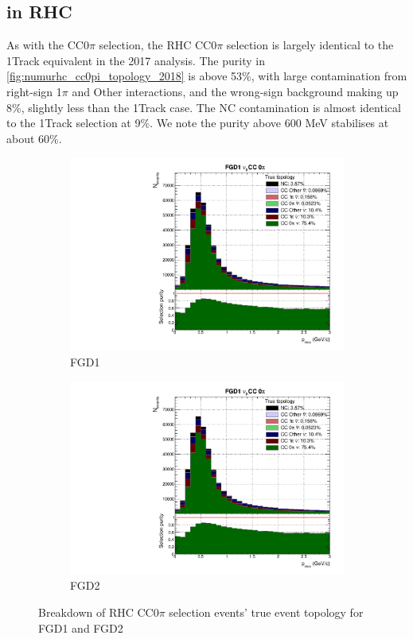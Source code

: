 \subsection{\numu in RHC}
As with the \numubar CC0$\pi$ selection, the \numu RHC CC0$\pi$ selection is largely identical to the 1Track equivalent in the 2017 analysis. The purity in \autoref{fig:numurhc_cc0pi_topology_2018} is above 53\%, with large contamination from right-sign 1$\pi$ and Other interactions, and the wrong-sign background making up 8\%, slightly less than the 1Track case. The NC contamination is almost identical to the 1Track selection at 9\%. We note the purity above 600 MeV stabilises at about 60\%.
\begin{figure}[h]
	\begin{subfigure}[t]{0.49\textwidth}
		\includegraphics[width=\textwidth,page=25, trim={0mm 0mm 0mm 9mm}, clip]{figures/mach3/2018/Selection/2018_RedNDmatrix_rebin_verbose_may_noweights_diagnostics}
		\caption{FGD1}
	\end{subfigure}
	\begin{subfigure}[t]{0.49\textwidth}
		\includegraphics[width=\textwidth,page=31, trim={0mm 0mm 0mm 9mm}, clip]{figures/mach3/2018/Selection/2018_RedNDmatrix_rebin_verbose_may_noweights_diagnostics}
		\caption{FGD2}
	\end{subfigure}
	\caption{Breakdown of \numu RHC CC0$\pi$ selection events' true event topology for FGD1 and FGD2 }
	\label{fig:numurhc_cc0pi_topology_2018}
\end{figure}


